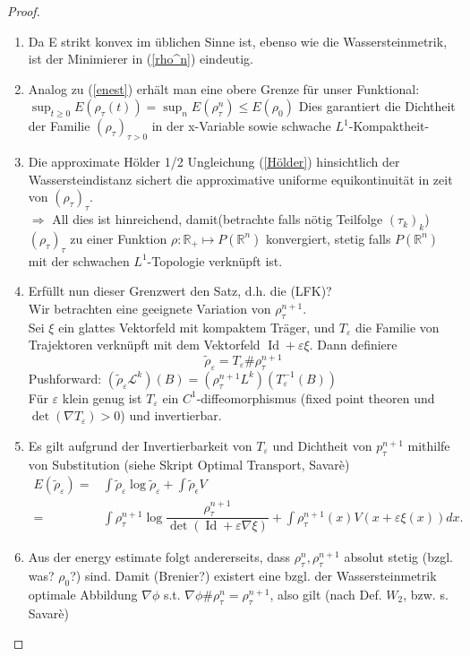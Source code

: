 \documentclass[11pt,a4paper,notitlepage]{scrreprt}
\newcommand{\RR}{\mathbb{R}}
\begin{document}
\begin{proof}
\begin{enumerate}
\item Da E strikt konvex im üblichen Sinne ist, ebenso wie die Wassersteinmetrik, ist der Minimierer in (\ref{rho^n})  eindeutig. 
\item Analog zu (\ref{enest}) erhält man eine obere Grenze für unser Funktional: $\sup_{t\geq 0} E(\rho_\tau(t))=\sup_n E(\rho_\tau^n)\leq E(\rho_0)$
Dies garantiert die Dichtheit der Familie $(\rho_\tau)_{\tau >0}$ in der x-Variable sowie schwache $L^1$-Kompaktheit- 
\item Die approximate Hölder 1/2 Ungleichung (\ref{Hölder}) hinsichtlich der Wassersteindistanz sichert die approximative uniforme equikontinuität in zeit von $(\rho_\tau)_\tau$. \\
$\Rightarrow$ All dies ist hinreichend, damit(betrachte falls nötig Teilfolge $(\tau_k)_k$) $(\rho_\tau)_\tau$ zu einer Funktion $\rho: \RR_+ \mapsto P(\RR^n)$ konvergiert, stetig falls $P(\RR^n)$ mit der schwachen $L^1$-Topologie verknüpft ist. \\
\item Erfüllt nun dieser Grenzwert den Satz, d.h. die (LFK)? \\
Wir betrachten eine geeignete Variation von $\rho_\tau^{n+1}$.\\
Sei $\xi$ ein glattes Vektorfeld mit kompaktem Träger, und $T_\varepsilon$ die Familie von Trajektoren verknüpft mit dem Vektorfeld $\operatorname{Id} +\varepsilon\xi$. Dann definiere
\[\tilde{\rho}_\varepsilon=T_\varepsilon \#\rho_\tau^{n+1} \]
Pushforward: $(\tilde{\rho}_\varepsilon \mathcal{L}^k)(B)=(\rho_\tau^{n+1}L^k)(T_\varepsilon^{-1}(B))$\\
Für $\varepsilon$ klein genug ist $T_\varepsilon$ ein $C^1$-diffeomorphismus (fixed point theoren und $\det(\nabla T_\varepsilon)>0$) und invertierbar.\\
\item Es gilt aufgrund der Invertierbarkeit von $T_\varepsilon$ und Dichtheit von $p_\tau^{n+1}$ mithilfe von Substitution (siehe Skript Optimal Transport, Savarè)  
\begin{eqnarray}
E(\tilde{\rho}_\varepsilon)=&\int\tilde{\rho}_\varepsilon\log\tilde{\rho}_\varepsilon+\int\tilde{\rho}_\epsilon V\\
=&\int \rho_\tau^{n+1}\log\dfrac{\rho_\tau^{n+1}}{\det(\operatorname{Id}+\varepsilon \nabla \xi)}+\int \rho_\tau^{n+1}(x)V(x+\varepsilon\xi(x))dx.
\end{eqnarray}
\item Aus der energy estimate folgt andererseits, dass $\rho_\tau^n, \rho_\tau^{n+1}$ absolut stetig (bzgl. was? $\rho_0$?) sind. Damit (Brenier?) existert eine bzgl. der Wassersteinmetrik optimale Abbildung $\nabla \phi$ s.t. $\nabla \phi \# \rho_\tau^n=\rho_\tau^{n+1}$, also gilt (nach Def. $W_2$, bzw. s. Savarè)

\end{enumerate}
\end{proof}
\end{document}

